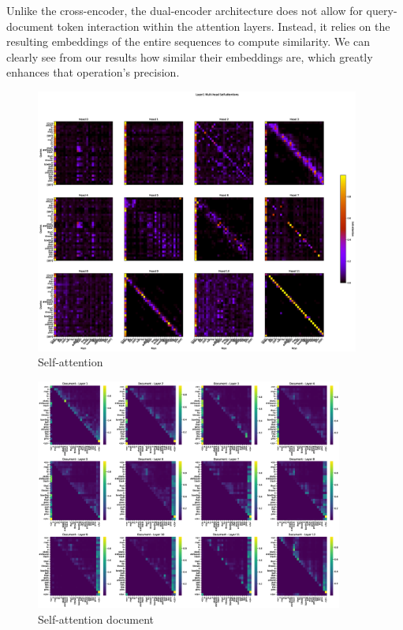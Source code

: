 \documentclass[runningheads]{llncs}
\begin{document}
Unlike the cross-encoder, the dual-encoder architecture does not allow for query-document token interaction within the attention layers. Instead, it relies on the resulting embeddings of the entire sequences to compute similarity. We can clearly see from our results how similar their embeddings are, which greatly enhances that operation's precision.

\vspace{2\baselineskip plus 0.5\baselineskip minus 0.5\baselineskip} %

\begin{figure}[!htb]
  \centering
  \includegraphics[width=0.95\textwidth, clip=true, trim = 70mm 25mm 130mm 45mm]{../figures/self_att_heads.eps}
  \caption{Self-attention}\label{self_att_heads}\label{img:self_attention}
\end{figure}

\clearpage

\begin{figure}[!htb]
  \centering
  \includegraphics[width=0.90\textwidth, clip=true]{../figures/attention_layers_document.eps}
  \caption{Self-attention document}\label{self_att_document}\label{img:self_attention_document}
\end{figure}
\end{document}
